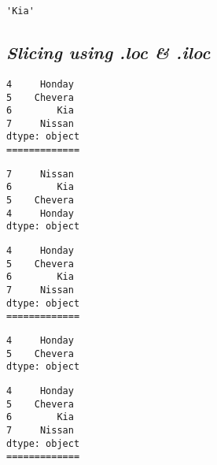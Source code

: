 \documentclass[11pt]{article}
\begin{document}
            \begin{tcolorbox}[breakable, size=fbox, boxrule=.5pt, pad at break*=1mm, opacityfill=0]
\begin{Verbatim}[commandchars=\\\{\}]
'Kia'
\end{Verbatim}
\end{tcolorbox}
        
    \hypertarget{slicing-using-.loc-.iloc}{%
\subsection{\texorpdfstring{\textbf{\emph{Slicing using .loc \&
.iloc}}}{Slicing using .loc \& .iloc}}\label{slicing-using-.loc-.iloc}}

    \begin{Verbatim}[commandchars=\\\{\}]
4     Honday
5    Chevera
6        Kia
7     Nissan
dtype: object
=============
    \end{Verbatim}

            \begin{tcolorbox}[breakable, size=fbox, boxrule=.5pt, pad at break*=1mm, opacityfill=0]
\begin{Verbatim}[commandchars=\\\{\}]
7     Nissan
6        Kia
5    Chevera
4     Honday
dtype: object
\end{Verbatim}
\end{tcolorbox}
        
    \begin{Verbatim}[commandchars=\\\{\}]
4     Honday
5    Chevera
6        Kia
7     Nissan
dtype: object
=============
    \end{Verbatim}

            \begin{tcolorbox}[breakable, size=fbox, boxrule=.5pt, pad at break*=1mm, opacityfill=0]
\begin{Verbatim}[commandchars=\\\{\}]
4     Honday
5    Chevera
dtype: object
\end{Verbatim}
\end{tcolorbox}
        
    \begin{Verbatim}[commandchars=\\\{\}]
4     Honday
5    Chevera
6        Kia
7     Nissan
dtype: object
=============
    \end{Verbatim}
\end{document}
